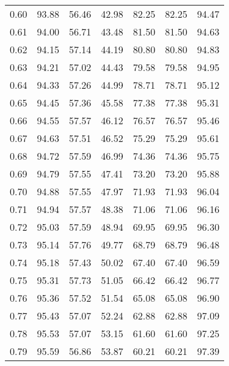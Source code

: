 \begin{tabular}{|c|c|c|c|c|c|c|}
      0.60 &     93.88 &     56.46 &      42.98 &   82.25 &      82.25 &         94.47 \\
      0.61 &     94.00 &     56.71 &      43.48 &   81.50 &      81.50 &         94.63 \\
      0.62 &     94.15 &     57.14 &      44.19 &   80.80 &      80.80 &         94.83 \\
      0.63 &     94.21 &     57.02 &      44.43 &   79.58 &      79.58 &         94.95 \\
      0.64 &     94.33 &     57.26 &      44.99 &   78.71 &      78.71 &         95.12 \\
      0.65 &     94.45 &     57.36 &      45.58 &   77.38 &      77.38 &         95.31 \\
      0.66 &     94.55 &     57.57 &      46.12 &   76.57 &      76.57 &         95.46 \\
      0.67 &     94.63 &     57.51 &      46.52 &   75.29 &      75.29 &         95.61 \\
      0.68 &     94.72 &     57.59 &      46.99 &   74.36 &      74.36 &         95.75 \\
      0.69 &     94.79 &     57.55 &      47.41 &   73.20 &      73.20 &         95.88 \\
      0.70 &     94.88 &     57.55 &      47.97 &   71.93 &      71.93 &         96.04 \\
      0.71 &     94.94 &     57.57 &      48.38 &   71.06 &      71.06 &         96.16 \\
      0.72 &     95.03 &     57.59 &      48.94 &   69.95 &      69.95 &         96.30 \\
      0.73 &     95.14 &     57.76 &      49.77 &   68.79 &      68.79 &         96.48 \\
      0.74 &     95.18 &     57.43 &      50.02 &   67.40 &      67.40 &         96.59 \\
      0.75 &     95.31 &     57.73 &      51.05 &   66.42 &      66.42 &         96.77 \\
      0.76 &     95.36 &     57.52 &      51.54 &   65.08 &      65.08 &         96.90 \\
      0.77 &     95.43 &     57.07 &      52.24 &   62.88 &      62.88 &         97.09 \\
      0.78 &     95.53 &     57.07 &      53.15 &   61.60 &      61.60 &         97.25 \\
      0.79 &     95.59 &     56.86 &      53.87 &   60.21 &      60.21 &         97.39 \\

\end{tabular}

